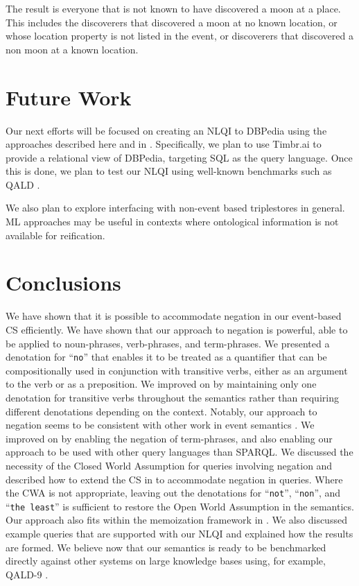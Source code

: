 \documentclass[../main.tex]{subfiles}
\begin{document}
\begin{refsection}
\examplespacing

\noindent The result is everyone that is not known to have discovered a moon at a place.  This includes the discoverers that discovered a moon at no known location, or whose location property is not listed in the event, or discoverers that discovered a non moon at a known location.

\examplespacing

\section{Future Work}
\label{sec:future}

\noindent Our next efforts will be focused on creating an NLQI to DBPedia using the approaches
described here and in \cite{peelar2020webistjournal}.  Specifically, we plan to use Timbr.ai \cite{timbr} to provide a relational view of DBPedia, targeting SQL as the query language.
Once this is done, we plan to test our NLQI using well-known benchmarks such as QALD \cite{qald9}.

We also plan to explore interfacing with non-event based triplestores in general.  ML approaches may be useful in contexts where ontological information is not available for reification.


\section{Conclusions}
\label{sec:conclusion}

\noindent We have shown that it is possible to accommodate negation in our event-based CS efficiently.  We have shown that our approach to negation is powerful, able to be applied to noun-phrases, verb-phrases, and term-phrases.  We presented a denotation for ``\texttt{no}'' that enables it to be treated as a quantifier that can be compositionally used in conjunction with transitive verbs, either as an argument to the verb or as a preposition.  We improved on \cite{frostboulos2002} by maintaining only one denotation for transitive verbs throughout the semantics rather than requiring different denotations depending on the context.  Notably, our approach to negation seems to be consistent with other work in event semantics \cite{champollion2011}.  We improved on \cite{ferre2013squall} by enabling the negation of term-phrases, and also enabling our approach to be used with other query languages than SPARQL.  We discussed the necessity of the Closed World Assumption for queries involving negation and described how to extend the CS in \cite{frostpeelar2019} to accommodate negation in queries.  Where the CWA is not appropriate, leaving out the denotations for ``\texttt{not}'', ``\texttt{non}'', and ``\texttt{the least}'' is sufficient to restore the Open World Assumption in the semantics.  Our approach also fits within the memoization framework in \cite{frostpeelar2019}. We also discussed example queries that are supported with our NLQI and explained how the results are formed.
We believe now that our semantics is ready to be benchmarked directly against other systems on large knowledge bases using, for example, QALD-9 \cite{qald9}.


\end{refsection}
\end{document}

